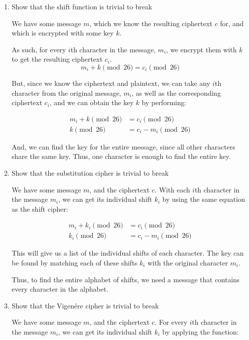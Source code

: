 \documentclass{article}
\begin{document}
\begin{enumerate}
    \begin{enumerate}
      \item Show that the shift function is trivial to break

        We have some message $m$, which we know the resulting ciphertext $c$
        for, and which is encrypted with some key $k$.

        As such, for every $i$th character in the message, $m_i$, we encrypt 
        them with $k$ to get the resulting ciphertext $c_i$.
        \[
          m_i + k \pmod{26} = c_i \pmod{26}
        \]

        But, since we know the ciphertext and plaintext, we can take any $i$th
        character from the original message, $m_i$, as well as the
        corresponding ciphertext $c_i$, and we can obtain the key $k$ by
        performing:

        \begin{align*}
          m_i + k \pmod{26} &= c_i \pmod{26}\\
          k \pmod{26} &= c_i - m_i \pmod{26}
        \end{align*}

        And, we can find the key for the entire message, since all other 
        characters share the same key. Thus, one character is enough to find 
        the entire key.
      \item Show that the substitution cipher is trivial to break

        We have some message $m$, and the ciphertext $c$. With each $i$th
        character in the message $m_i$, we can get its individual shift $k_i$ by
        using the same equation as the shift cipher:

        \begin{align*}
          m_i + k_i \pmod{26} &= c_i \pmod{26}\\
          k_i \pmod{26} &= c_i - m_i \pmod{26}
        \end{align*}

        This will give us a list of the individual shifts of each character. The
        key can be found by matching each of these shifts $k_i$ with the original
        character $m_i$.

        Thus, to find the entire alphabet of shifts, we need a message that
        contains every character in the alphabet.
      \item Show that the Vigen\'ere cipher is trivial to break

        We have some message $m$, and the ciphertext $c$. For every $i$th
        character in the message $m_i$, we can get its individual shift $k_i$ by
        applying the function:


\end{enumerate}
\end{enumerate}
\end{document}
